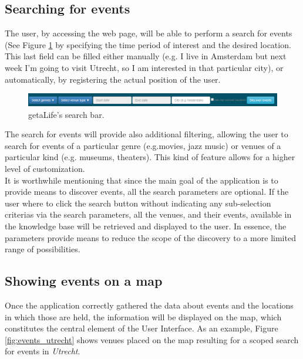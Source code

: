\documentclass[hidelinks,a4paper]{article}
\begin{document}
\subsection{Searching for events}
The user, by accessing the web page, will be able to perform a search for events (See Figure \ref{fig:search_bar} by specifying the time period of interest and the desired location. This last field can be filled either manually (e.g. I live in Amsterdam but next week I'm going to visit Utrecht, so I am interested in that particular city), or automatically, by registering the actual position of the user.\\

\begin{figure}[h!]
  \centering
    \includegraphics[scale=0.4]{images/search_bar.png}    
    \caption{getaLife's search bar.}
    \label{fig:search_bar}
\end{figure}

\indent The search for events will provide also additional filtering, allowing the user to search for events of a particular genre (e.g.movies, jazz music) or venues of a particular kind (e.g. museums, theaters). This kind of feature allows for a higher level of customization.\\
\indent It is worthwhile mentioning that since the main goal of the application is to provide means to discover events, all the search parameters are optional. If the user where to click the search button without indicating any sub-selection criterias via the search parameters, all the venues, and their events, available in the knowledge base will be retrieved and displayed to the user. In essence, the parameters provide means to reduce the scope of the discovery to a more limited range of possibilities.

\subsection{Showing events on a map}
Once the application correctly gathered the data about events and the locations in which those are held, the information will be displayed on the map, which constitutes the central element of the User Interface. As an example, Figure \ref{fig:events_utrecht} shows venues placed on the map resulting for a scoped search for events in \emph{Utrecht}.
\end{document}
